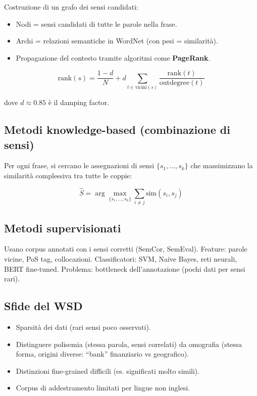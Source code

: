 \documentclass[12pt,a4paper]{article}
\begin{document}
Costruzione di un grafo dei sensi candidati:
\begin{itemize}[leftmargin=1.5em]
  \item Nodi = sensi candidati di tutte le parole nella frase.
  \item Archi = relazioni semantiche in WordNet (con pesi = similarità).
  \item Propagazione del contesto tramite algoritmi come \textbf{PageRank}.
\end{itemize}

\begin{formulabox}
\[
\text{rank}(s) = \frac{1-d}{N} + d \sum_{t \in \text{vicini}(s)} \frac{\text{rank}(t)}{\text{outdegree}(t)}
\]
\end{formulabox}
dove $d \approx 0.85$ è il damping factor.

\subsection{Metodi knowledge-based (combinazione di sensi)}

Per ogni frase, si cercano le assegnazioni di sensi $\{s_1,\dots,s_k\}$ che massimizzano la similarità complessiva tra tutte le coppie:

\[
\hat{S} = \arg\max_{\{s_1,\dots,s_k\}} \sum_{i \neq j} \text{sim}(s_i, s_j)
\]

\subsection{Metodi supervisionati}

Usano corpus annotati con i sensi corretti (SemCor, SemEval). Feature: parole vicine, PoS tag, collocazioni. Classificatori: SVM, Naive Bayes, reti neurali, BERT fine-tuned. Problema: bottleneck dell'annotazione (pochi dati per sensi rari).

\subsection{Sfide del WSD}

\begin{itemize}[leftmargin=1.5em]
  \item Sparsità dei dati (rari sensi poco osservati).
  \item Distinguere polisemia (stessa parola, sensi correlati) da omografia (stessa forma, origini diverse: ``bank'' finanziario vs geografico).
  \item Distinzioni fine-grained difficili (es. significati molto simili).
  \item Corpus di addestramento limitati per lingue non inglesi.
\end{itemize}
\end{document}
